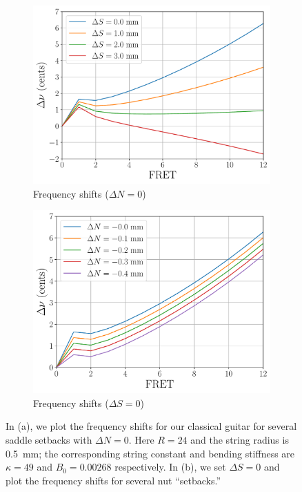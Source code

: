 \begin{figure}
  \centering
  \begin{subfigure}[b]{0.8\textwidth}
      \centering
      \includegraphics[width=5.0in]{../figures/comp_ds}
      \caption{Frequency shifts ($\Delta N = 0$)}
      \label{fig:comp_ds}
  \end{subfigure}
  \par\vspace{0.25in}
  \begin{subfigure}[b]{0.8\textwidth}
      \centering
      \includegraphics[width=5.0in]{../figures/comp_dn}
      \caption{Frequency shifts ($\Delta S = 0$)}
      \label{fig:comp_dn}
  \end{subfigure}
  \caption{\label{fig:comp_dsdn} In (a), we plot the frequency shifts for our classical guitar for several saddle setbacks with $\Delta N = 0$. Here $R = 24$ and the string radius is 0.5~mm; the corresponding string constant and bending stiffness are $\kappa = 49$ and $B_0 = 0.00268$ respectively. In (b), we set $\Delta S = 0$ and plot the frequency shifts for several nut ``setbacks.''}
\end{figure}


